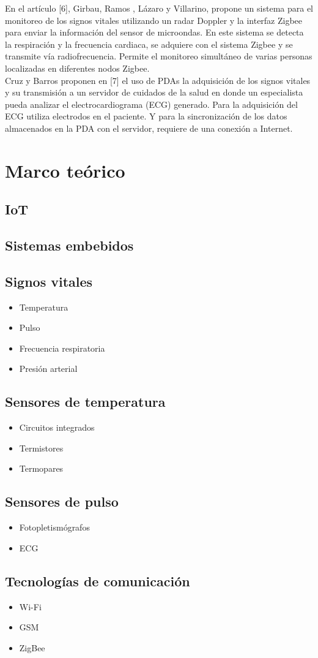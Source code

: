 	En el artículo [6], Girbau, Ramos , Lázaro y Villarino, propone un sistema para el monitoreo de los signos vitales utilizando un radar Doppler y la interfaz Zigbee para enviar la información del sensor de microondas. En este sistema se detecta la respiración y la frecuencia cardiaca, se adquiere con el sistema Zigbee y se transmite vía radiofrecuencia. Permite el monitoreo simultáneo de varias personas localizadas en diferentes nodos Zigbee. \\
	
	Cruz y Barros proponen en [7] el uso de PDAs la adquisición de los signos vitales y su transmisión a un servidor de cuidados de la salud en donde un especialista pueda analizar el electrocardiograma (ECG) generado. Para la adquisición del ECG utiliza electrodos en el paciente. Y para la sincronización de los datos almacenados en la PDA con el servidor, requiere de una conexión a Internet.
	
\section{Marco teórico}
	\subsection{IoT}
	\subsection{Sistemas embebidos}
	\subsection{Signos vitales}
		\begin{itemize}
			\item Temperatura
			\item Pulso
			\item Frecuencia respiratoria
			\item Presión arterial
		\end{itemize}
	\subsection{Sensores de temperatura}
		\begin{itemize}
			\item Circuitos integrados
			\item Termistores
			\item Termopares
		\end{itemize}
	\subsection{Sensores de pulso}
		\begin{itemize}
			\item Fotopletismógrafos
			\item ECG
		\end{itemize}
	\subsection{Tecnologías de comunicación}
		\begin{itemize}
			\item Wi-Fi
			\item GSM
			\item ZigBee
		\end{itemize}	